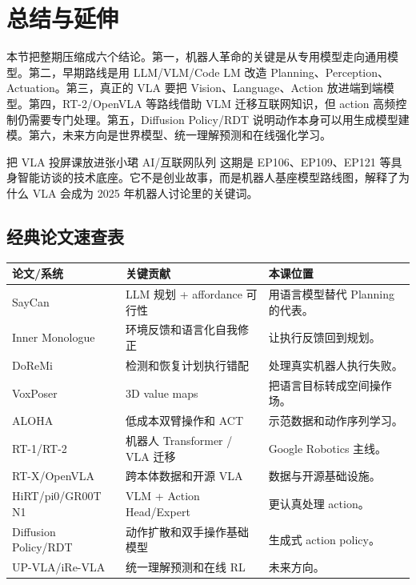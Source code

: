 \section{总结与延伸}

本节把整期压缩成六个结论。第一，机器人革命的关键是从专用模型走向通用模型。第二，早期路线是用 LLM/VLM/Code LM 改造 Planning、Perception、Actuation。第三，真正的 VLA 要把 Vision、Language、Action 放进端到端模型。第四，RT-2/OpenVLA 等路线借助 VLM 迁移互联网知识，但 action 高频控制仍需要专门处理。第五，Diffusion Policy/RDT 说明动作本身可以用生成模型建模。第六，未来方向是世界模型、统一理解预测和在线强化学习。

\begin{importantbox}{把 VLA 投屏课放进张小珺 AI/互联网队列}
这期是 EP106、EP109、EP121 等具身智能访谈的技术底座。它不是创业故事，而是机器人基座模型路线图，解释了为什么 VLA 会成为 2025 年机器人讨论里的关键词。
\end{importantbox}

\subsection{经典论文速查表}

\noindent\begin{tabularx}{\textwidth}{p{}p{}X}
\toprule
论文/系统 & 关键贡献 & 本课位置 \\
\midrule
SayCan & LLM 规划 + affordance 可行性 & 用语言模型替代 Planning 的代表。 \\
Inner Monologue & 环境反馈和语言化自我修正 & 让执行反馈回到规划。 \\
DoReMi & 检测和恢复计划执行错配 & 处理真实机器人执行失败。 \\
VoxPoser & 3D value maps & 把语言目标转成空间操作场。 \\
ALOHA & 低成本双臂操作和 ACT & 示范数据和动作序列学习。 \\
RT-1/RT-2 & 机器人 Transformer / VLA 迁移 & Google Robotics 主线。 \\
RT-X/OpenVLA & 跨本体数据和开源 VLA & 数据与开源基础设施。 \\
HiRT/pi0/GR00T N1 & VLM + Action Head/Expert & 更认真处理 action。 \\
Diffusion Policy/RDT & 动作扩散和双手操作基础模型 & 生成式 action policy。 \\
UP-VLA/iRe-VLA & 统一理解预测和在线 RL & 未来方向。 \\
\bottomrule
\end{tabularx}

